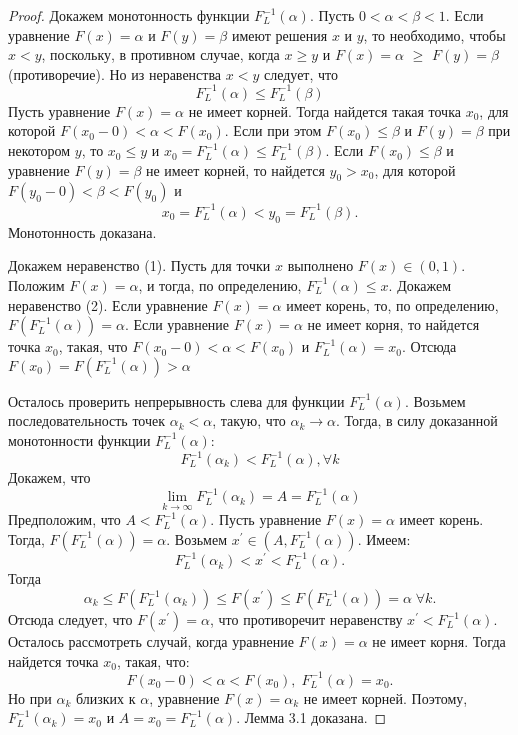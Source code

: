 \documentclass[14pt,a4paper]{article}
\theoremstyle{plain}
\theoremstyle{definition}
\begin{document}
\begin{proof}
 Докажем монотонность функции $F^{-1}_{L}(\alpha).$
Пусть $0 < \alpha < \beta < 1$. Если уравнение $F(x) = \alpha$ и $F(y) = \beta$ имеют решения $x$ и $y$, то необходимо, чтобы $x<y$, поскольку, в противном случае, когда $x\ge y$
и $F(x) = \alpha$ $\ge$ $F(y) = \beta$ (противоречие). Но из неравенства $x<y$ следует, что
$$
F^{-1}_{L}(\alpha)\le F^{-1}_{L}(\beta)
$$
Пусть уравнение $F(x) = \alpha$  не имеет корней. Тогда найдется такая точка $x_0$, для которой $F(x_0 -0) < \alpha < F(x_0)$.
Если при этом $F(x_0) \le \beta$ и $F(y) = \beta$ при некотором $y$, то $x_0 \le y$ и $x_0 = F^{-1}_{L}(\alpha) \le  F^{-1}_{L}(\beta) $.
Если $F(x_0) \le \beta$ и уравнение $F(y) = \beta$ не имеет корней, то найдется $y_0 > x_0$, для которой $F(y_0-0)<\beta<F(y_0)$ и $$x_0 = F^{-1}_{L}(\alpha) < y_0 = F^{-1}_{L}(\beta).$$
Монотонность доказана.

Докажем неравенство (1).
Пусть для точки $x$ выполнено $F(x) \in (0,1)$.
Положим $F(x) = \alpha$, и тогда, по определению, $F^{-1}_{L}(\alpha) \le x.$
 Докажем неравенство (2).
Если уравнение $F(x) = \alpha$ имеет корень, то, по определению, $F(F^{-1}_{L}(\alpha)) = \alpha$.
Если уравнение $F(x) = \alpha$ не имеет корня, то найдется точка $x_0$, такая, что $F(x_0-0) < \alpha < F(x_0)$ и $F^{-1}_{L}(\alpha)  = x_0$. Отсюда $F(x_0) = F(F^{-1}_{L}(\alpha)) > \alpha$

  Осталось проверить непрерывность слева для функции $F^{-1}_{L}(\alpha) $.
Возьмем последовательность точек $\alpha_k < \alpha$, такую, что $\alpha_k \rightarrow \alpha$.
Тогда, в силу доказанной монотонности функции $F^{-1}_{L}(\alpha) $:
$$
F^{-1}_{L}(\alpha_k) < F^{-1}_{L}(\alpha), \forall k
$$
Докажем, что
$$
\lim\limits_{k \rightarrow \infty}F^{-1}_{L}(\alpha_k) = A = F^{-1}_{L}(\alpha)
$$
Предположим, что $A < F^{-1}_{L}(\alpha)$. Пусть уравнение $F(x)= \alpha$ имеет корень. Тогда, $F(F^{-1}_{L}(\alpha)) = \alpha$. Возьмем $x^{'} \in (A, F^{-1}_{L}(\alpha))$.
Имеем: $$F^{-1}_{L}(\alpha_k) < x^{'} < F^{-1}_{L}(\alpha).$$
Тогда $$\alpha_k \le F(F^{-1}_{L}(\alpha_k)) \le F(x^{'}) \le F(F^{-1}_{L}(\alpha)) = \alpha\;\forall k.$$
Отсюда следует, что $F(x^{'}) = \alpha$, что противоречит неравенству $x^{'} < F^{-1}_{L}(\alpha)$.
Осталось рассмотреть случай, когда уравнение $F(x)= \alpha$ не имеет корня.
Тогда найдется точка $x_0$, такая, что:
$$
F(x_0 -0) < \alpha < F(x_0),\; F^{-1}_{L}(\alpha)=x_0.
$$
Но при $\alpha_k$ близких к $\alpha$, уравнение $F(x)= \alpha_k$ не имеет корней.
Поэтому, $F^{-1}_{L}(\alpha_k)=x_0$ и $A = x_0 = F^{-1}_{L}(\alpha)$.
Лемма 3.1 доказана.
\end{proof}
\end{document}
